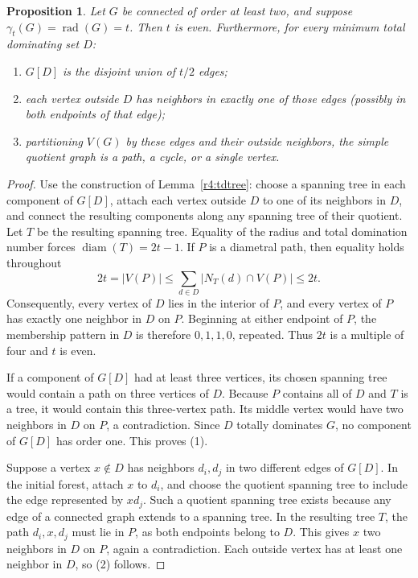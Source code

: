 \documentclass[11pt,a4paper]{article}
\newtheorem{proposition}[theorem]{Proposition}
\theoremstyle{remark}
\begin{document}
\begin{proposition}\label{prop:269-equality-structure}
Let $G$ be connected of order at least two, and suppose
$\gamma_t(G)=\operatorname{rad}(G)=t$. Then $t$ is even.
Furthermore, for every minimum total dominating set $D$:
\begin{enumerate}
\item $G[D]$ is the disjoint union of $t/2$ edges;
\item each vertex outside $D$ has neighbors in exactly one of those
edges (possibly in both endpoints of that edge);
\item partitioning $V(G)$ by these edges and their outside neighbors,
the simple quotient graph is a path, a cycle, or a single vertex.
\end{enumerate}
\end{proposition}
\begin{proof}
Use the construction of Lemma~\ref{r4:tdtree}: choose a spanning
tree in each component of $G[D]$, attach each vertex outside $D$
to one of its neighbors in $D$, and connect the resulting components
along any spanning tree of their quotient. Let $T$ be the resulting
spanning tree. Equality of the radius and total domination number
forces $\operatorname{diam}(T)=2t-1$. If $P$ is a diametral path,
then equality holds throughout
\[
 2t=|V(P)|\le
 \sum_{d\in D}|N_T(d)\cap V(P)|\le2t.
\]
Consequently, every vertex of $D$ lies in the interior of $P$,
and every vertex of $P$ has exactly one neighbor in $D$ on $P$.
Beginning at either endpoint of $P$, the membership pattern in $D$
is therefore $0,1,1,0$, repeated. Thus $2t$ is a multiple of four
and $t$ is even.

If a component of $G[D]$ had at least three vertices, its chosen
spanning tree would contain a path on three vertices of $D$.
Because $P$ contains all of $D$ and $T$ is a tree, it would contain
this three-vertex path. Its middle vertex would have two neighbors
in $D$ on $P$, a contradiction. Since $D$ totally dominates $G$,
no component of $G[D]$ has order one. This proves (1).

Suppose a vertex $x\notin D$ has neighbors $d_i,d_j$ in two
different edges of $G[D]$. In the initial forest, attach $x$ to
$d_i$, and choose the quotient spanning tree to include the edge
represented by $xd_j$. Such a quotient spanning tree exists because
any edge of a connected graph extends to a spanning tree. In the
resulting tree $T$, the path $d_i,x,d_j$ must lie in $P$, as both
endpoints belong to $D$. This gives $x$ two neighbors in $D$ on
$P$, again a contradiction. Each outside vertex has at least one
neighbor in $D$, so (2) follows.


\end{proof}
\end{document}
